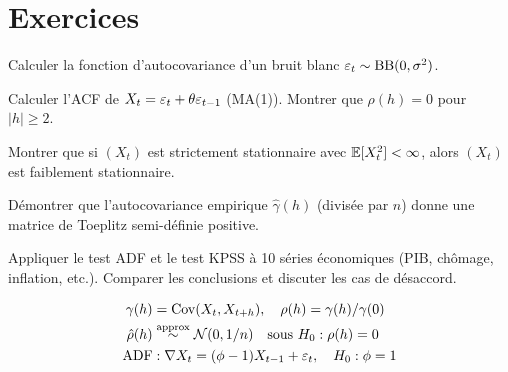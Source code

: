 \section{Exercices}

\begin{exercice}[$\star$]
Calculer la fonction d'autocovariance d'un bruit blanc $\varepsilon_t\sim\mathrm{BB}(0,\sigma^2)$.
\end{exercice}

\begin{exercice}[$\star$]
Calculer l'ACF de $X_t = \varepsilon_t + \theta\varepsilon_{t-1}$ (MA(1)). Montrer que $\rho(h)=0$ pour $|h|\geq 2$.
\end{exercice}

\begin{exercice}[$\star\star$]
Montrer que si $(X_t)$ est strictement stationnaire avec $\mathbb{E}[X_t^2]<\infty$, alors $(X_t)$ est faiblement stationnaire.
\end{exercice}

\begin{exercice}[$\star\star$]
D\'emontrer que l'autocovariance empirique $\hat{\gamma}(h)$ (divis\'ee par $n$) donne une matrice de Toeplitz semi-d\'efinie positive.
\end{exercice}

\begin{exercice}
Appliquer le test ADF et le test KPSS \`a 10 s\'eries \'economiques (PIB, ch\^omage, inflation, etc.). Comparer les conclusions et discuter les cas de d\'esaccord.
\end{exercice}

\begin{formules}
\begin{align*}
\gamma(h) &= \operatorname{Cov}(X_t,X_{t+h}), \quad \rho(h)=\gamma(h)/\gamma(0) \\
\hat{\rho}(h) &\stackrel{\text{approx}}{\sim} \mathcal{N}(0,1/n) \quad\text{sous }H_0:\rho(h)=0 \\
\text{ADF} &: \nabla X_t = (\phi-1)X_{t-1}+\varepsilon_t, \quad H_0:\phi=1
\end{align*}
\end{formules}
